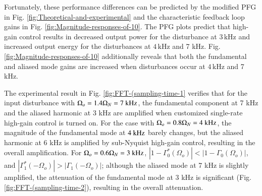 \documentclass [11pt, proquest] {uwthesis}[2020/02/24]
\begin{document}
Fortunately, these performance differences can be predicted by the
modified PFG in Fig. \ref{fig:Theoretical-and-experimental} and the
characteristic feedback loop gains in Fig. \ref{fig:Magnitude-responses-of-10}.
The PFG plots predict that high-gain control results in decreased
output power for the disturbance at $3\,\text{kHz}$ and increased
output energy for the disturbances at $4\,\text{kHz}$ and 7 kHz.
Fig. \ref{fig:Magnitude-responses-of-10} additionally reveals that both
the fundamental and aliased mode gains are increased when disturbances
occur at $4\,\text{kHz}$ and 7 kHz.

The experimental result in Fig. \ref{fig:FFT-(sampling-time-1} verifies
that for the input disturbance with $\Omega_{o}=1.4\Omega_{N}=7\textnormal{ kHz}$,
the fundamental component at 7 kHz and the aliased harmonic at 3 kHz
are amplified when customized single-rate high-gain control is turned
on. For the case with $\Omega_{o}=0.8\Omega_{N}=4\textnormal{ kHz}$,
the magnitude of the fundamental mode at $4\textnormal{ kHz}$ barely
changes, but the aliased harmonic at 6 kHz is amplified by sub-Nyquist
high-gain control, resulting in the overall amplification. For $\Omega_{o}=0.6\Omega_{N}=3\textnormal{ kHz}$,
$\left|1-\Gamma_{0}^{*}(\Omega_{o})\right|<\left|1-\Gamma_{0}(\Omega_{o})\right|$,
and $\left|\Gamma_{1}^{*}(-\Omega_{o})\right|>\left|\Gamma_{1}(-\Omega_{o})\right|$;
although the aliased mode at 7 kHz is slightly amplified, the attenuation
of the fundamental mode at 3 kHz is significant (Fig. \ref{fig:FFT-(sampling-time-2}),
resulting in the overall attenuation.
\end{document}
